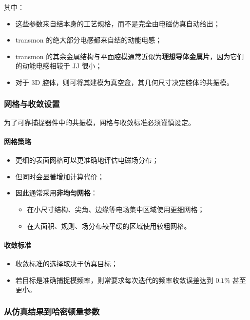 \documentclass[12pt,a4paper,oneside]{ctexbook}
\begin{document}
其中：
\begin{itemize}
    \item 这些参数来自结本身的工艺规格，而不是完全由电磁仿真自动给出；
    \item transmon 的绝大部分电感都来自结的动能电感；
    \item transmon 的其余金属结构与平面腔模通常近似为\textbf{理想导体金属片}，因为它们的动能电感相较于 JJ 很小；
    \item 对于 3D 腔体，则可将其建模为真空盒，其几何尺寸决定腔体的共振模。
\end{itemize}

\subsubsection{网格与收敛设置}

为了可靠捕捉器件中的共振模，网格与收敛标准必须谨慎设定。

\paragraph{网格策略}
\begin{itemize}
    \item 更细的表面网格可以更准确地评估电磁场分布；
    \item 但同时会显著增加计算代价；
    \item 因此通常采用\textbf{非均匀网格}：
    \begin{itemize}
        \item 在小尺寸结构、尖角、边缘等电场集中区域使用更细网格；
        \item 在大面积、规则、场分布较平缓的区域使用较粗网格。
    \end{itemize}
\end{itemize}

\paragraph{收敛标准}
\begin{itemize}
    \item 收敛标准的选择取决于仿真目标；
    \item 若目标是准确捕捉模频率，则常要求每次迭代的频率收敛误差达到 \(0.1\%\) 甚至更小。
\end{itemize}

\subsubsection{从仿真结果到哈密顿量参数}
\end{document}
